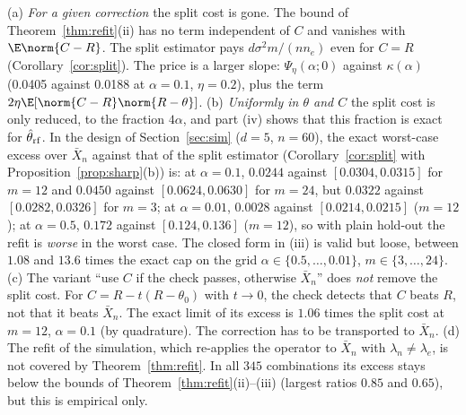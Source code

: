 \begin{remark}\label{rem:refitcost}
(a) \emph{For a given correction} the split cost is gone. The bound of Theorem~\ref{thm:refit}(ii) has no term independent of $C$ and vanishes with $\E\norm{C-R}$. The split estimator pays $d\sigma^2m/(nn_e)$ even for $C=R$ (Corollary~\ref{cor:split}). The price is a larger slope: $\Psi_\eta(\alpha;0)$ against $\kappa(\alpha)$ (0.0405 against 0.0188 at $\alpha=0.1$, $\eta=0.2$), plus the term $2\eta\E[\norm{C-R}\norm{R-\theta}]$.
(b) \emph{Uniformly in $\theta$ and $C$} the split cost is only reduced, to the fraction $4\alpha$, and part (iv) shows that this fraction is exact for $\hat\theta_{\rm rf}$. In the design of Section~\ref{sec:sim} ($d=5$, $n=60$), the exact worst-case excess over $\bar X_n$ against that of the split estimator (Corollary~\ref{cor:split} with Proposition~\ref{prop:sharp}(b)) is: at $\alpha=0.1$, $0.0244$ against $[0.0304,0.0315]$ for $m=12$ and $0.0450$ against $[0.0624,0.0630]$ for $m=24$, but $0.0322$ against $[0.0282,0.0326]$ for $m=3$; at $\alpha=0.01$, $0.0028$ against $[0.0214,0.0215]$ ($m=12$); at $\alpha=0.5$, $0.172$ against $[0.124,0.136]$ ($m=12$), so with plain hold-out the refit is \emph{worse} in the worst case. The closed form in (iii) is valid but loose, between $1.08$ and $13.6$ times the exact cap on the grid $\alpha\in\{0.5,\dots,0.01\}$, $m\in\{3,\dots,24\}$.
(c) The variant ``use $C$ if the check passes, otherwise $\bar X_n$'' does \emph{not} remove the split cost. For $C=R-t(R-\theta_0)$ with $t\to0$, the check detects that $C$ beats $R$, not that it beats $\bar X_n$. The exact limit of its excess is $1.06$ times the split cost at $m=12$, $\alpha=0.1$ (by quadrature). The correction has to be transported to $\bar X_n$.
(d) The refit of the simulation, which re-applies the operator to $\bar X_n$ with $\lambda_n\ne\lambda_e$, is not covered by Theorem~\ref{thm:refit}. In all $345$ combinations its excess stays below the bounds of Theorem~\ref{thm:refit}(ii)--(iii) (largest ratios $0.85$ and $0.65$), but this is empirical only.
\end{remark}

